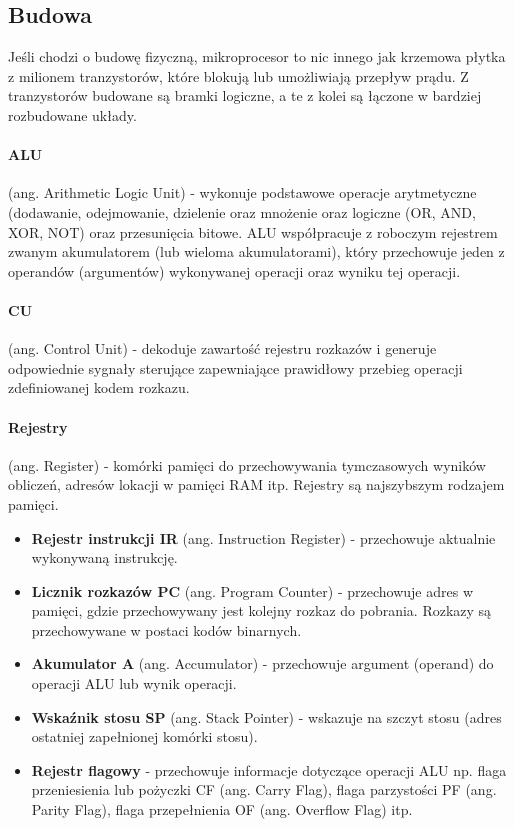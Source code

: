\documentclass[]{report}
\begin{document}
\subsection{Budowa}
Jeśli chodzi o budowę fizyczną, mikroprocesor to nic innego jak krzemowa płytka z milionem tranzystorów, które blokują lub umożliwiają przepływ prądu. Z tranzystorów budowane są bramki logiczne, a te z kolei są łączone w bardziej rozbudowane układy.

\paragraph{ALU} (ang. Arithmetic Logic Unit) - wykonuje podstawowe operacje arytmetyczne (dodawanie, odejmowanie, dzielenie oraz mnożenie oraz logiczne (OR, AND, XOR, NOT) oraz przesunięcia bitowe. ALU współpracuje z roboczym rejestrem zwanym akumulatorem (lub wieloma akumulatorami), który przechowuje jeden z operandów (argumentów) wykonywanej operacji oraz wyniku tej operacji.

\paragraph{CU} (ang. Control Unit) - dekoduje zawartość rejestru rozkazów i generuje odpowiednie sygnały sterujące zapewniające prawidłowy przebieg operacji zdefiniowanej kodem rozkazu.

\paragraph{Rejestry} (ang. Register) - komórki pamięci do przechowywania tymczasowych wyników obliczeń, adresów lokacji w pamięci RAM itp. Rejestry są najszybszym rodzajem pamięci.
\begin{itemize}
\item \textbf{Rejestr instrukcji IR} (ang. Instruction Register) - przechowuje aktualnie wykonywaną instrukcję.
\item\textbf{ Licznik rozkazów PC} (ang. Program Counter) - przechowuje adres w pamięci, gdzie przechowywany jest kolejny rozkaz do pobrania. Rozkazy są przechowywane w postaci kodów binarnych.
\item \textbf{Akumulator A} (ang. Accumulator) - przechowuje argument (operand) do operacji ALU lub wynik operacji.
\item \textbf{Wskaźnik stosu SP} (ang. Stack Pointer) - wskazuje na szczyt stosu (adres ostatniej zapełnionej komórki stosu).
\item \textbf{Rejestr flagowy} - przechowuje informacje dotyczące operacji ALU np. flaga przeniesienia lub pożyczki CF (ang. Carry Flag), flaga parzystości PF (ang. Parity Flag), flaga przepełnienia OF (ang. Overflow Flag) itp.
\end{itemize}
\end{document}
